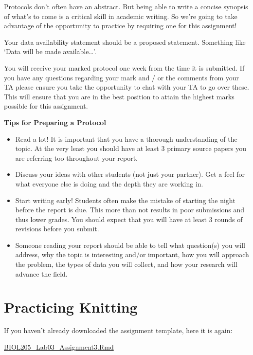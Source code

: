 \documentclass[
]{book}
\providecommand{\tightlist}{%
  \setlength{\itemsep}{0pt}\setlength{\parskip}{0pt}}
\begin{document}
Protocols don't often have an abstract. But being able to write a concise synopsis of what's to come is a critical skill in academic writing. So we're going to take advantage of the opportunity to practice by requiring one for this assignment!

Your data availability statement should be a proposed statement. Something like `Data will be made available\ldots{}'.

You will receive your marked protocol one week from the time it is submitted. If you have any questions regarding your mark and / or the comments from your TA please ensure you take the opportunity to chat with your TA to go over these. This will ensure that you are in the best position to attain the highest marks possible for this assignment.

\textbf{Tips for Preparing a Protocol}

\begin{itemize}
\tightlist
\item
  Read a lot! It is important that you have a thorough understanding of the topic. At the very least you should have at least 3 primary source papers you are referring too throughout your report.
\item
  Discuss your ideas with other students (not just your partner). Get a feel for what everyone else is doing and the depth they are working in.
\item
  Start writing early! Students often make the mistake of starting the night before the report is due. This more than not results in poor submissions and thus lower grades. You should expect that you will have at least 3 rounds of revisions before you submit.
\item
  Someone reading your report should be able to tell what question(s) you will address, why the topic is interesting and/or important, how you will approach the problem, the types of data you will collect, and how your research will advance the field.
\end{itemize}

\hypertarget{practicing-knitting}{%
\section*{Practicing Knitting}\label{practicing-knitting}}

If you haven't already downloaded the assignment template, here it is again:

\href{https://osf.io/download/qhc2v}{BIOL205\_Lab03\_Assignment3.Rmd}
\end{document}
